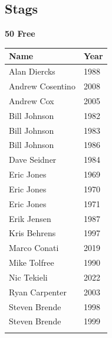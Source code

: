 \subsection{Stags}

\vspace{0.5em}
\noindent\begin{minipage}[t]{0.48\textwidth}
\centering
\textbf{\textcolor{teamprimary}{50 Free}}\par
\vspace{0.5em}
\centering
\small
\renewcommand{\arraystretch}{1.0}
\setlength{\tabcolsep}{4pt}
\begin{tabular}{@{}p{3.0cm}p{1.0cm}@{}}
\toprule
\textbf{Name} & \textbf{Year} \\
\midrule
Alan Diercks & 1988 \\
Andrew Cosentino & 2008 \\
Andrew Cox & 2005 \\
Bill Johnson & 1982 \\
Bill Johnson & 1983 \\
Bill Johnson & 1986 \\
Dave Seidner & 1984 \\
Eric Jones & 1969 \\
Eric Jones & 1970 \\
Eric Jones & 1971 \\
Erik Jensen & 1987 \\
Kris Behrens & 1997 \\
Marco Conati & 2019 \\
Mike Tolfree & 1990 \\
Nic Tekieli & 2022 \\
Ryan Carpenter & 2003 \\
Steven Brende & 1998 \\
Steven Brende & 1999 \\
\bottomrule
\vspace{0.5em}
\end{tabular}
\end{minipage}
\hfill
